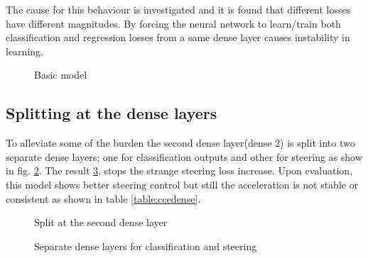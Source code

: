 The cause for this behaviour is investigated and it is found that different losses have
different magnitudes. By forcing the neural network to learn/train both classification and
regression losses from a same dense layer causes instability in learning.
\begin{figure}[t]
	\centering
    \def\svgwidth{\textwidth}
    \caption{Basic model}
    \label{fig:ds3categoricalcrossentropybasic}
\end{figure}
\subsection{Splitting at the dense layers}
To alleviate some of the burden the second dense layer(dense 2) is split into two separate dense
layers; one for classification outputs and other for steering as show in fig. \ref{fig:steeringdensesplit}. The result \ref{fig:ds3categoricalcrossentropydense}, stops
the strange steering loss increase. Upon evaluation, this model shows better steering
control but still the acceleration is not stable or consistent as shown in table
\ref{table:ccedense}.
\begin{figure}[!ht]
	\centering
    \def\svgwidth{0.2\textwidth}
    \caption{Split at the second dense layer}
    \label{fig:steeringdensesplit}
\end{figure}

\begin{figure}[!h]
	\centering
    \def\svgwidth{0.9\textwidth}
    \caption{Separate dense layers for classification and steering}
    \label{fig:ds3categoricalcrossentropydense}
\end{figure}

